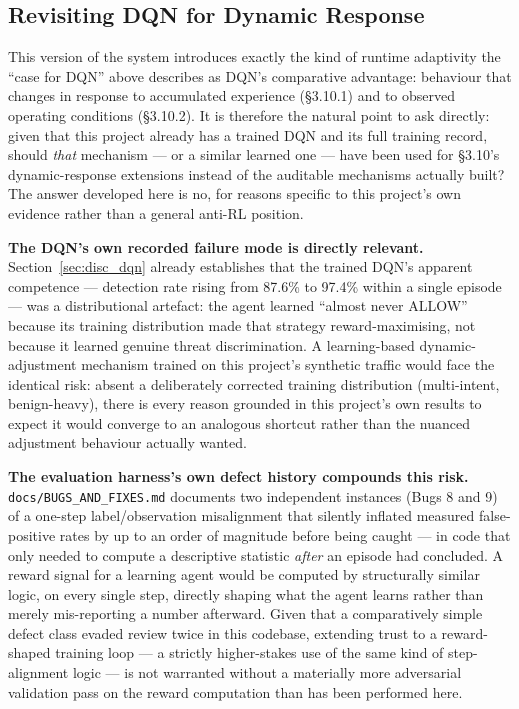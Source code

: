 \subsection{Revisiting DQN for Dynamic Response}
\label{sec:disc_dqn_revisit}

This version of the system introduces exactly the kind of runtime
adaptivity the ``case for DQN'' above describes as DQN's comparative
advantage: behaviour that changes in response to accumulated experience
(\S3.10.1) and to observed operating conditions (\S3.10.2).
It is therefore the natural point to ask directly: given that this project
already has a trained DQN and its full training record, should \emph{that}
mechanism --- or a similar learned one --- have been used for \S3.10's
dynamic-response extensions instead of the auditable mechanisms actually
built?
The answer developed here is no, for reasons specific to this project's own
evidence rather than a general anti-RL position.

\textbf{The DQN's own recorded failure mode is directly relevant.}
Section~\ref{sec:disc_dqn} already establishes that the trained DQN's
apparent competence --- detection rate rising from 87.6\% to 97.4\% within a
single episode --- was a distributional artefact: the agent learned
``almost never ALLOW'' because its training distribution made that strategy
reward-maximising, not because it learned genuine threat discrimination.
A learning-based dynamic-adjustment mechanism trained on this project's
synthetic traffic would face the identical risk: absent a deliberately
corrected training distribution (multi-intent, benign-heavy), there is
every reason grounded in this project's own results to expect it would
converge to an analogous shortcut rather than the nuanced adjustment
behaviour actually wanted.

\textbf{The evaluation harness's own defect history compounds this risk.}
\texttt{docs/BUGS\_AND\_FIXES.md} documents two independent instances (Bugs
8 and 9) of a one-step label/observation misalignment that silently
inflated measured false-positive rates by up to an order of magnitude
before being caught --- in code that only needed to compute a descriptive
statistic \emph{after} an episode had concluded.
A reward signal for a learning agent would be computed by structurally
similar logic, on every single step, directly shaping what the agent learns
rather than merely mis-reporting a number afterward.
Given that a comparatively simple defect class evaded review twice in this
codebase, extending trust to a reward-shaped training loop --- a strictly
higher-stakes use of the same kind of step-alignment logic --- is not
warranted without a materially more adversarial validation pass on the
reward computation than has been performed here.

